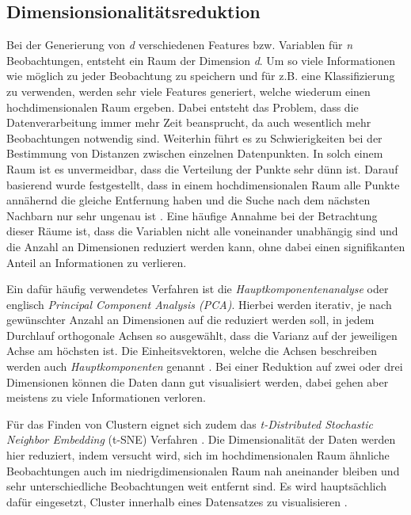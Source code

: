 \subsection{Dimensionsionalitätsreduktion}
Bei der Generierung von \textit{d} verschiedenen Features bzw. Variablen für \textit{n} Beobachtungen, entsteht ein Raum der Dimension \textit{d}. 
Um so viele Informationen wie möglich zu jeder Beobachtung zu speichern und für z.B. eine Klassifizierung zu verwenden, werden sehr viele Features generiert, welche wiederum einen hochdimensionalen Raum ergeben. Dabei entsteht das Problem, dass die Datenverarbeitung immer mehr Zeit beansprucht, da auch wesentlich mehr Beobachtungen notwendig sind. Weiterhin führt es zu Schwierigkeiten bei der Bestimmung von Distanzen zwischen einzelnen Datenpunkten. In solch einem Raum ist es unvermeidbar, dass die Verteilung der Punkte sehr dünn ist. Darauf basierend wurde festgestellt, dass in einem hochdimensionalen Raum alle Punkte annähernd die gleiche Entfernung haben und die Suche nach dem nächsten Nachbarn nur sehr ungenau ist \cite[Kap.~1]{hinneburg2000nearest}. Eine häufige Annahme bei der Betrachtung dieser Räume ist, dass die Variablen nicht alle voneinander unabhängig sind und die Anzahl an Dimensionen reduziert werden kann, ohne dabei einen signifikanten Anteil an Informationen zu verlieren.

Ein dafür häufig verwendetes Verfahren ist die \emph{Hauptkomponentenanalyse} oder englisch \emph{Principal Component Analysis (PCA)}. Hierbei werden iterativ, je nach gewünschter Anzahl an Dimensionen auf die reduziert werden soll, in jedem Durchlauf orthogonale Achsen so ausgewählt, dass die Varianz auf der jeweiligen Achse am höchsten ist. Die Einheitsvektoren, welche die Achsen beschreiben werden auch \textit{Hauptkomponenten} genannt \cite[S.213-214]{geron2017hands}. Bei einer Reduktion auf zwei oder drei Dimensionen können die Daten dann gut visualisiert werden, dabei gehen aber meistens zu viele Informationen verloren.

Für das Finden von Clustern eignet sich zudem das \textit{t-Distributed Stochastic Neighbor Embedding} (t-SNE) Verfahren \cite{maaten2008visualizing}. Die Dimensionalität der Daten werden hier reduziert, indem versucht wird, sich im hochdimensionalen Raum ähnliche Beobachtungen auch im niedrigdimensionalen Raum nah aneinander bleiben und sehr unterschiedliche Beobachtungen weit entfernt sind. Es wird hauptsächlich dafür eingesetzt, Cluster innerhalb eines Datensatzes zu visualisieren \cite[S.~226]{geron2017hands}.

